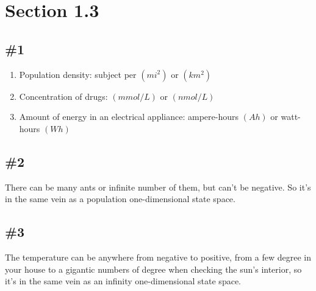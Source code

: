 \documentclass[12pt]{article}
\begin{document}
\section*{Section 1.3}
\subsection*{\#1}
\begin{enumerate}[label=\alph*.]
    \item Population density: subject per $(mi^2)$ or $(km^2)$
    \item Concentration of drugs:
    $(mmol/L)$ or $(nmol/L)$
    \item Amount of energy in an electrical appliance: ampere-hours $(Ah)$ or watt-hours $(Wh)$
\end{enumerate}

\subsection*{\#2}

There can be many ants or infinite number of them, but can't be negative. So it's in the same vein as a population one-dimensional state space.

\subsection*{\#3}

The temperature can be anywhere from negative to positive, from a few degree in your house to a gigantic numbers of degree when checking the sun's interior, so it's in the same vein as an infinity one-dimensional state space.
\end{document}
